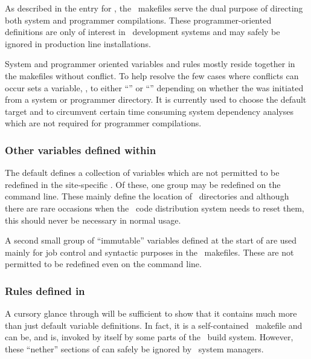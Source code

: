 As described in the entry for , the \aipspp\ makefiles serve
the dual purpose of directing both system and programmer compilations.  These
programmer-oriented definitions are only of interest in \aipspp\ development
systems and may safely be ignored in production line installations.

System and programmer oriented variables and rules mostly reside together in
the makefiles without conflict.  To help resolve the few cases where conflicts
can occur  sets a variable, , to either
``'' or ``'' depending on whether the
 was initiated from a system or programmer directory.  It is
currently used to choose the default target and to circumvent certain time
consuming system dependency analyses which are not required for programmer
compilations.

\subsubsection*{Other variables defined within }

The default  defines a collection of variables which are not
permitted to be redefined in the site-specific .  Of these, one
group may be redefined on the  command line.  These mainly
define the location of \aipspp\ directories and although there are rare
occasions when the \aipspp\ code distribution system needs to reset them, this
should never be necessary in normal usage.

A second small group of ``immutable'' variables defined at the start of
 are used mainly for job control and syntactic purposes in the
\aipspp\ makefiles.  These are not permitted to be redefined even on the
 command line.

\subsubsection*{Rules defined in }

A cursory glance through  will be sufficient to show
that it contains much more than just default variable definitions.  In fact,
it is a self-contained \gnu\ makefile and can be, and is, invoked by itself by
some parts of the \aipspp\ build system.  However, these ``nether'' sections
of  can safely be ignored by \aipspp\ system managers.


